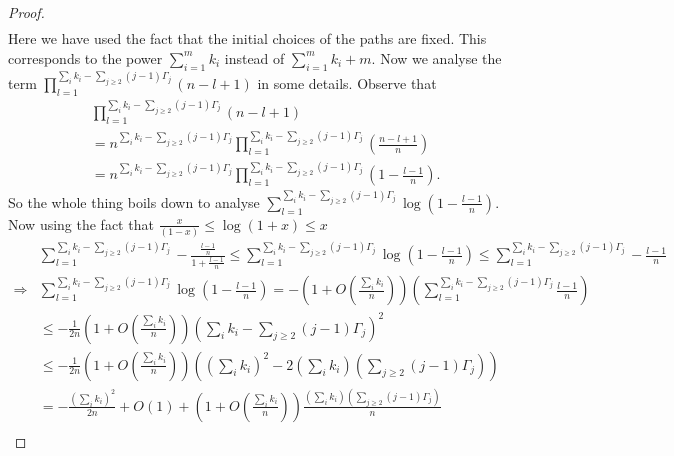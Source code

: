 \documentclass[12pt]{article}
\numberwithin{equation}{section}
\numberwithin{equation}{section}
\theoremstyle{definition}
\renewcommand{\1}{\bf 1}
\begin{document}
\begin{proof}
\begin{equation}
\begin{split}
\end{split}
\end{equation} 
Here we have used the fact that the initial choices of the paths are fixed. This corresponds to the power $\sum_{i=1}^{m}k_{i}$ instead of $\sum_{i=1}^{m} k_{i}+m$. Now we analyse the term $\prod_{l=1}^{\sum_{i}k_{i}- \sum_{j\ge 2}(j-1)\Gamma_{j}} (n-l+1)$ in some details. Observe that 
\begin{equation}
\begin{split}
&\prod_{l=1}^{\sum_{i}k_{i}- \sum_{j\ge 2}(j-1)\Gamma_{j}} (n-l+1)\\
&= n^{\sum_{i}k_{i}- \sum_{j\ge 2}(j-1)\Gamma_{j}}\prod_{l=1}^{\sum_{i}k_{i}- \sum_{j\ge 2}(j-1)\Gamma_{j}} \left(\frac{n-l+1}{n}\right)\\
&= n^{\sum_{i}k_{i}- \sum_{j\ge 2}(j-1)\Gamma_{j}}\prod_{l=1}^{\sum_{i}k_{i}-\sum_{j\ge 2}(j-1)\Gamma_{j}}\left( 1- \frac{l-1}{n} \right).
\end{split}
\end{equation}  
So the whole thing boils down to analyse $\sum_{l=1}^{\sum_{i}k_{i}-\sum_{j\ge 2}(j-1)\Gamma_{j}}\log\left(1- \frac{l-1}{n}\right)$. Now using the fact that $\frac{x}{(1-x)}\le \log(1+x) \le x$
\begin{equation}\label{eq:expansionlog}
\begin{split}
&\sum_{l=1}^{\sum_{i}k_{i}-\sum_{j \ge 2}(j-1)\Gamma_{j}}-\frac{\frac{l-1}{n}}{1+ \frac{l-1}{n}} \le \sum_{l=1}^{\sum_{i}k_{i}-\sum_{j \ge 2}(j-1)\Gamma_{j}} \log\left( 1- \frac{l-1}{n} \right)\le \sum_{l=1}^{\sum_{i}k_{i}-\sum_{j \ge 2}(j-1)\Gamma_{j}} -\frac{l-1}{n}\\
\Rightarrow & \sum_{l=1}^{\sum_{i}k_{i}-\sum_{j \ge 2}(j-1)\Gamma_{j}} \log\left( 1- \frac{l-1}{n} \right) = - \left( 1+O\left(\frac{\sum_{i}k_{i}}{n}\right) \right)\left( \sum_{l=1}^{\sum_{i}k_{i}-\sum_{j \ge 2}(j-1)\Gamma_{j}}\frac{l-1}{n} \right)\\
& \le -\frac{1}{2n}\left(1+O\left( \frac{\sum_{i}k_{i}}{n} \right)  \right)\left( \sum_{i}k_{i}-\sum_{j\ge 2} (j-1)\Gamma_{j} \right)^2\\
&\le -\frac{1}{2n}\left(1+O\left( \frac{\sum_{i}k_{i}}{n} \right)  \right) \left( \left(\sum_{i}k_{i}\right)^2 -2\left( \sum_{i}k_{i} \right)\left(\sum_{j\ge 2}(j-1)\Gamma_{j}\right) \right)\\
&= - \frac{\left(\sum_{i}k_{i}\right)^2}{2n}+O(1) + \left( 1+O\left( \frac{\sum_{i}k_{i}}{n} \right)\right)\frac{\left( \sum_{i}k_{i} \right)\left(\sum_{j\ge 2}(j-1)\Gamma_{j}\right) }{n}\\

\end{split}
\end{equation}
\end{proof}
\end{document}
